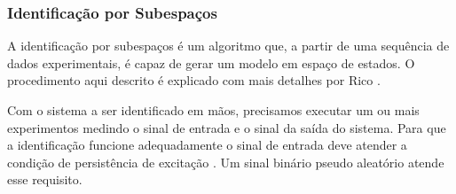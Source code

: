 %
%
%
%
%

\subsubsection {Identificação por Subespaços}
A identificação por subespaços é um algoritmo que, a partir de uma sequência de dados experimentais, é capaz de gerar um modelo em espaço de estados. O procedimento aqui descrito é explicado com mais detalhes por Rico \cite{ricco2012}.


Com o sistema a ser identificado em mãos, precisamos executar um ou mais experimentos medindo o sinal de entrada e o sinal da saída do sistema. Para que a identificação funcione adequadamente o sinal de entrada deve atender a condição de persistência de excitação \cite{katayama2005}. Um sinal binário pseudo aleatório atende esse requisito.


